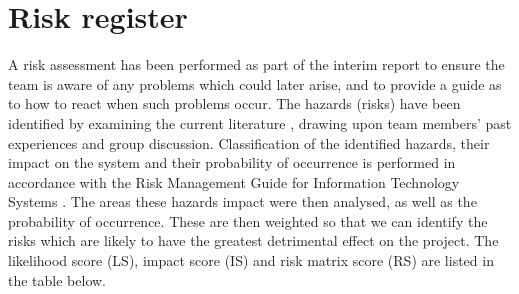 \section{Risk register}
\label{sec:riskregister}

A risk assessment has been performed as part of the interim
report to ensure the team is aware of any problems which could later
arise, and to provide a guide as to how to react when such problems
occur. The hazards (risks) have been identified by examining the 
current literature \cite{boehm1991software,jones1998minimizing}, drawing upon team members' past experiences and group 
discussion. Classification of the identified hazards, their impact on the system and their probability of occurrence is performed 
in accordance with the Risk Management Guide for Information Technology 
Systems \cite{stoneburner2002risk}. The areas these hazards impact were then analysed, as 
well as the probability of occurrence. These are then weighted so 
that we can identify the risks which are likely to 
have the greatest detrimental effect on the project. The likelihood 
score (LS), impact score (IS) and risk matrix score (RS) are listed 
in the table below.

